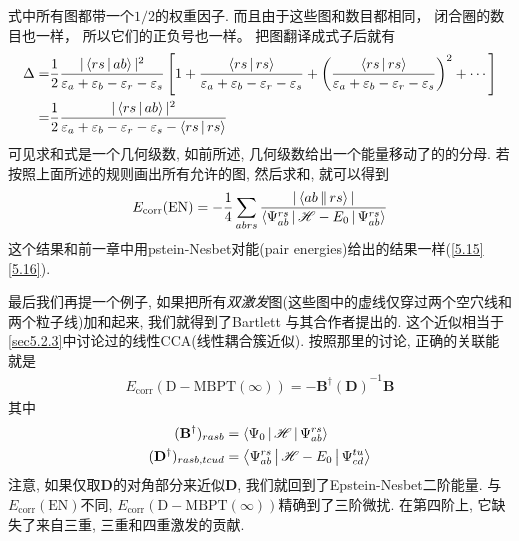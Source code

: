 式中所有图都带一个$1/2$的权重因子. 
而且由于这些图和数目都相同，
闭合圈的数目也一样，
所以它们的正负号也一样。
把图翻译成式子后就有
\begin{align*}
\Delta =& \frac{1}{2}\frac{|\Braket{rs|ab}|^2}{\varepsilon_{a}+\varepsilon_{b}-\varepsilon_{r}-\varepsilon_{s}}\left[ 1+ \frac{\Braket{rs|rs}}{\varepsilon_{a}+\varepsilon_{b}-\varepsilon_{r}-\varepsilon_{s}}+ \left( \frac{\Braket{rs|rs}}{\varepsilon_{a}+\varepsilon_{b}-\varepsilon_{r}-\varepsilon_{s}}\right)^2 + \cdots \right]\\
=& \frac{1}{2}\frac{|\Braket{rs|ab}|^2}{\varepsilon_{a}+\varepsilon_{b}-\varepsilon_{r}-\varepsilon_{s} - \Braket{rs|rs}}
\end{align*}
可见求和式是一个几何级数, 
如前所述, 
几何级数给出一个能量移动了的的分母. 
若按照上面所述的规则画出所有允许的图, 
然后求和, 
就可以得到
\begin{align}
E_\mathrm{corr}(\mathrm{EN}) = -\frac{1}{4}\sum_{abrs}\frac{|\Braket{ab||rs}|}{\Braket{\Psi_{ab}^{rs}|\mathscr{H}-E_0|\Psi_{ab}^{rs}}}
\end{align}
这个结果和前一章中用pstein-Nesbet对能(pair energies)给出的结果一样(\autoref{5.15}\autoref{5.16}).


最后我们再提一个例子, 
如果把所有\emph{双激发}图(这些图中的虚线仅穿过两个空穴线和两个粒子线)加和起来, 
我们就得到了Bartlett
与其合作者提出的. 
这个近似相当于\autoref{sec5.2.3}中讨论过的线性CCA(线性耦合簇近似). 
按照那里的讨论, 
正确的关联能就是
\begin{align}
E_\mathrm{corr}(\mathrm{D-MBPT}(\infty)) = -\mathbf{B^\dagger(D)}^{-1}\mathbf{B}
\end{align}
其中
\begin{subequations}
\begin{align}
(\mathbf{B}^\dagger)_{rasb} &= \Braket{\Psi_0|\mathscr{H}|\Psi_{ab}^{rs}}\\
(\mathbf{D}^\dagger)_{rasb,tcud} &= \Braket{\Psi_{ab}^{rs}|\mathscr{H}-E_0|\Psi_{cd}^{tu}}
\end{align}
\end{subequations}
注意, 
如果仅取$\mathbf{D}$的对角部分来近似$\mathbf{D}$, 
我们就回到了Epstein-Nesbet二阶能量. 
与$E_\mathrm{corr}(\mathrm{EN})$不同, 
$E_\mathrm{corr}(\mathrm{D-MBPT}(\infty))$精确到了三阶微扰. 
在第四阶上, 
它缺失了来自三重, 
三重和四重激发的贡献.


